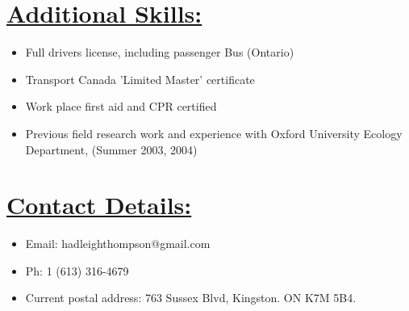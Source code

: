 \documentclass[]{article}
\begin{document}
\section*{\underline{Additional Skills:}}
\begin{itemize}
\item Full drivers license, including passenger Bus (Ontario)
\item Transport Canada 'Limited Master' certificate
\item Work place first aid and CPR certified
\item Previous field research work and experience with Oxford University Ecology Department, (Summer 2003, 2004)
\end{itemize}

\section*{\underline{Contact Details:}}
\begin{itemize}
\item Email: hadleighthompson@gmail.com
\item Ph: 1 (613) 316-4679
\item Current postal address: 763 Sussex Blvd, Kingston. ON K7M 5B4.
\end{itemize}

\end{document}
